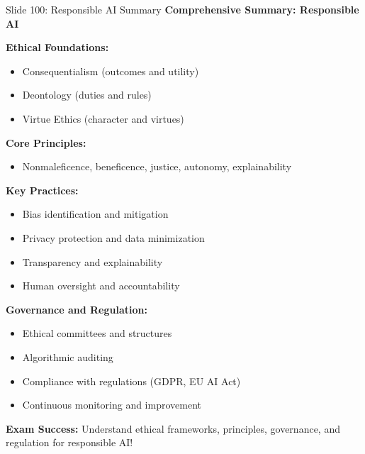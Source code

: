 \documentclass[8pt]{beamer}
\begin{document}
	\begin{frame}{Slide 100: Responsible AI Summary}
		\fontsize{6.5}{7.5}\selectfont
		\textbf{Comprehensive Summary: Responsible AI}
		
		\vspace{0.1cm}
		\textbf{Ethical Foundations:}
		\begin{itemize}
			\item Consequentialism (outcomes and utility)
			\item Deontology (duties and rules)
			\item Virtue Ethics (character and virtues)
		\end{itemize}
		
		\vspace{0.1cm}
		\textbf{Core Principles:}
		\begin{itemize}
			\item Nonmaleficence, beneficence, justice, autonomy, explainability
		\end{itemize}
		
		\vspace{0.1cm}
		\textbf{Key Practices:}
		\begin{itemize}
			\item Bias identification and mitigation
			\item Privacy protection and data minimization
			\item Transparency and explainability
			\item Human oversight and accountability
		\end{itemize}
		
		\vspace{0.1cm}
		\textbf{Governance and Regulation:}
		\begin{itemize}
			\item Ethical committees and structures
			\item Algorithmic auditing
			\item Compliance with regulations (GDPR, EU AI Act)
			\item Continuous monitoring and improvement
		\end{itemize}
		
		\textcolor{myred}{\textbf{Exam Success:}} Understand \textcolor{myblue}{ethical frameworks, principles, governance, and regulation} for responsible AI!
	\end{frame}
	
\end{document}
